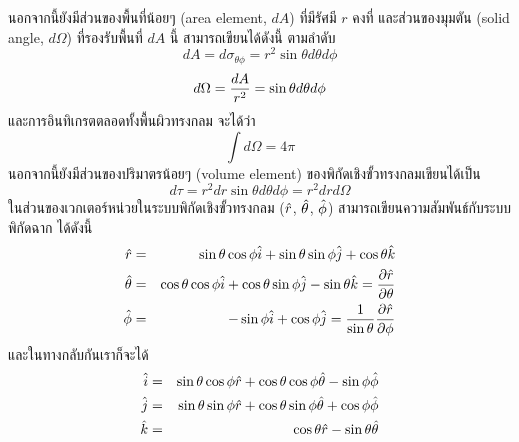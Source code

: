นอกจากนี้ยังมีส่วนของพื้นที่น้อยๆ (area element, $dA$) ที่มีรัศมี $r$ คงที่ และส่วนของมุมตัน (solid angle, $d\Omega$) ที่รองรับพื้นที่ $dA$ นี้ สามารถเขียนได้ดังนี้ ตามลำดับ
\begin{equation}\label{SphereCoordA}
dA = d\sigma_{\theta\phi} = r^2 \sin\theta d\theta d\phi
\end{equation}
\begin{equation}\label{SphereCoordOmega}
d\Omega = \f{dA}{r^2} = \sin\theta d\theta d\phi
\end{equation}
และการอินทิเกรตตลอดทั้งพื้นผิวทรงกลม จะได้ว่า
\begin{equation}\label{SphereCoorIntdOmega}
\int d\Omega = 4\pi
\end{equation}
นอกจากนี้ยังมีส่วนของปริมาตรน้อยๆ (volume element) ของพิกัดเชิงขั้วทรงกลมเขียนได้เป็น
\begin{equation}\label{ShereCoorVolElement}
d\tau = r^2 dr \sin\theta d\theta d\phi = r^2 dr d\Omega
\end{equation}
ในส่วนของเวกเตอร์หน่วยในระบบพิกัดเชิงขั้วทรงกลม ($\rh$, $\tt$, $\ph$) สามารถเขียนความสัมพันธ์กับระบบพิกัดฉาก ได้ดังนี้
\begin{eqnarray}\label{SphereCoorUnitVec}
\rh &=& \sin\theta\cos\phi\i + \sin\theta\sin\phi\j + \cos\theta\k \no \\
\tt &=& \cos\theta\cos\phi\i + \cos\theta\sin\phi\j - \sin\theta\k = \f{\pd\rh}{\pd\theta} \\
\ph &=& - \sin\phi\i + \cos\phi\j = \f{1}{\sin\theta}\f{\pd\rh}{\pd\phi} \no
\end{eqnarray}
และในทางกลับกันเราก็จะได้
\begin{eqnarray}\label{SphereCoorUnitVecXYZ}
\i &=& \sin\theta\cos\phi\rh + \cos\theta\cos\phi\tt - \sin\phi\ph \no \\
\j &=& \sin\theta\sin\phi\rh + \cos\theta\sin\phi\tt + \cos\phi\ph \\
\k &=& \cos\theta\rh - \sin\theta\tt \no
\end{eqnarray}

